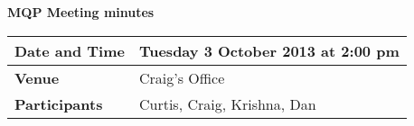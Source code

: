 \documentclass[a4wide,10pt]{extarticle}
\begin{document}
\thispagestyle{empty}

\begin{center}
\textbf{MQP Meeting minutes}
\vspace{0.33cm}
\end{center}

\begin{center}
\begin{tabular}{| m{2.8cm} | m{13.6cm} |} \hline
\textbf{Date and Time} & Tuesday 3 October 2013 at 2:00 pm \\ \hline
\textbf{Venue} & Craig's Office \\ \hline
\textbf{Participants} & Curtis, Craig, Krishna, Dan\\ \hline
\end{tabular}
\end{center}
\end{document}
